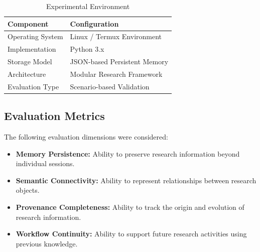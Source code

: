 \begin{table}[t]
\caption{Experimental Environment}
\label{tab:experimental_environment}

\centering
\small

\begin{tabular}{ll}

\toprule

Component & Configuration \\

\midrule

Operating System & Linux / Termux Environment \\

Implementation & Python 3.x \\

Storage Model & JSON-based Persistent Memory \\

Architecture & Modular Research Framework \\

Evaluation Type & Scenario-based Validation \\

\bottomrule

\end{tabular}

\end{table}



\subsection{Evaluation Metrics}


The following evaluation dimensions were considered:


\begin{itemize}

\item
\textbf{Memory Persistence:}
Ability to preserve research information beyond individual sessions.


\item
\textbf{Semantic Connectivity:}
Ability to represent relationships between research objects.


\item
\textbf{Provenance Completeness:}
Ability to track the origin and evolution of research information.


\item
\textbf{Workflow Continuity:}
Ability to support future research activities using previous knowledge.


\end{itemize}




